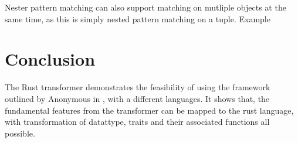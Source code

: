 \documentclass[ oneside,%
                    author={James Elgar},
                    degree={MEng},
                     title={Bidirectional transformer between functional and \\ object-oriented programming in Rust},
                  subtitle={}]{dissertation}
\newcommand{\weixin}{Anonymous }
\begin{document}
Nester pattern matching can also support matching on mutliple objects at the same time, as this is simply nested pattern matching on a tuple. Example 







\chapter{Conclusion}
\label{chap:conclusion}

The Rust transformer demonstrates the feasibility of using the framework outlined by \weixin in \cite{food}, with a different languages. It shows that, the fundamental features from the transformer can be mapped to the rust language, with transformation of datattype, traits and their associated functions all possible. 
\end{document}
